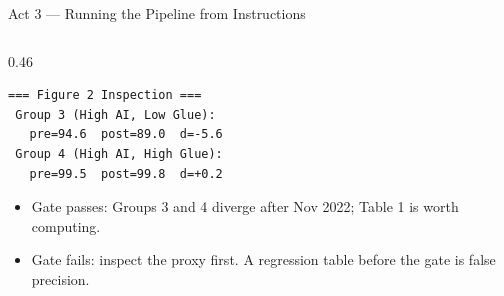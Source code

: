 \documentclass[10pt,english,aspectratio=169]{beamer}
\begin{document}
\begin{frame}[fragile]{Act 3 --- Running the Pipeline from Instructions}
\begin{columns}[T]
\begin{column}{0.46\textwidth}
\begin{tcolorbox}[colback=gray!5,colframe=gray!40]
\begin{lstlisting}[style=pythonstyle,numbers=none,basicstyle=\ttfamily\scriptsize,language={}]
=== Figure 2 Inspection ===
 Group 3 (High AI, Low Glue):
   pre=94.6  post=89.0  d=-5.6
 Group 4 (High AI, High Glue):
   pre=99.5  post=99.8  d=+0.2
\end{lstlisting}
\end{tcolorbox}
\begin{itemize}\scriptsize
  \item Gate passes: Groups 3 and 4 diverge after Nov 2022; Table 1 is worth computing.
  \item Gate fails: inspect the proxy first. A regression table before the gate is false precision.
\end{itemize}
\end{column}
\end{columns}
\end{frame}

\end{document}
